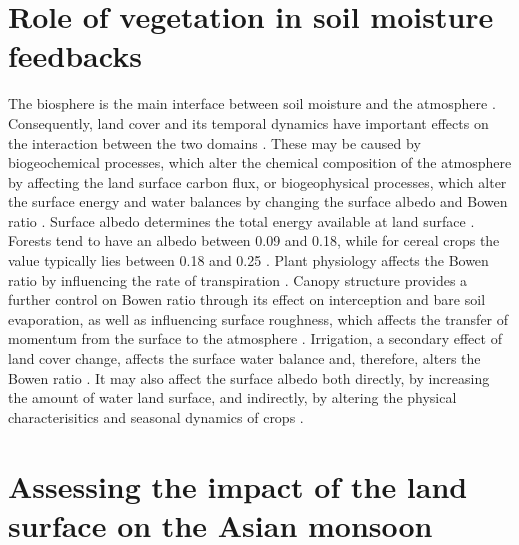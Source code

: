 \documentclass{icldt}\usepackage[]{graphicx}\usepackage[]{color}
\begin{document}
%

\section{Role of vegetation in soil moisture feedbacks}

The biosphere is the main interface between soil moisture and the atmosphere \citep{Lawrence2007a,Dirmeyer2006a}. Consequently, land cover and its temporal dynamics have important effects on the interaction between the two domains \citep{Sellers1997,Pielke2002,Feddema2005}. These may be caused by biogeochemical processes, which alter the chemical composition of the atmosphere by affecting the land surface carbon flux, or biogeophysical processes, which alter the surface energy and water balances by changing the surface albedo and Bowen ratio \citep{Feddema2005}. Surface albedo determines the total energy available at land surface \citep{Meehl1994,Pitman2003}. Forests tend to have an albedo between 0.09 and 0.18, while for cereal crops the value typically lies between 0.18 and 0.25 \citep{Barry2010}. Plant physiology affects the Bowen ratio by influencing the rate of transpiration \citep{Hillel1998}. Canopy structure provides a further control on Bowen ratio through its effect on interception and bare soil evaporation, as well as influencing surface roughness, which affects the transfer of momentum from the surface to the atmosphere \citep{Bounoua2002,Arneth2012}. Irrigation, a secondary effect of land cover change, affects the surface water balance and, therefore, alters the Bowen ratio \citep{Boucher2004}. It may also affect the surface albedo both directly, by increasing the amount of water land surface, and indirectly, by altering the physical characterisitics and seasonal dynamics of crops \citep{Seneviratne2010}. \\

%

\section{Assessing the impact of the land surface on the Asian monsoon}
\end{document}
